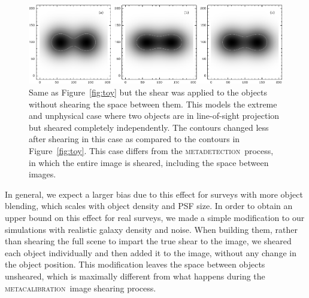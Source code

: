 \documentclass[iop, twocolappendix, appendixfloats, numberedappendix, apj]{hackemulateapj}
\newcommand{\mcal}{\textsc{metacalibration}}
\newcommand{\mdet}{\textsc{metadetection}}
\begin{document}
\begin{figure}
    \begin{center}
        \includegraphics[width=\textwidth]{toy-no-full-scene.pdf}

        \caption{Same as Figure~\ref{fig:toy} but the shear was applied to the
        objects without shearing the space between them. This models the extreme
        and unphysical case where two objects are in line-of-sight projection but
        sheared completely independently.  The contours changed less after shearing
        in this case as compared to the contours in Figure~\ref{fig:toy}.  This
        case differs from the \mdet\ process, in which the entire image is sheared,
        including the space between images.  \label{fig:toynoscene} }
    \end{center}

\end{figure}


In general, we expect a larger bias due to this effect for surveys with more
object blending, which scales with object density and PSF size.  In order to
obtain an upper bound on this effect for real surveys, we made a simple
modification to our simulations with realistic galaxy density and noise.  When
building them, rather than shearing the full scene to impart the true shear to
the image, we sheared each object individually and then added it to the image,
without any change in the object position. This modification leaves the space
between objects unsheared, which is maximally different from what happens
during the \mcal\ image shearing process.
\end{document}
